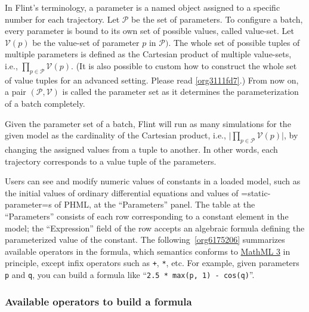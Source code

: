 \documentclass[a4paper,10pt]{report}
\begin{document}
In Flint's terminology, a parameter is a named object assigned to a specific
number for each trajectory.
Let \(\mathcal{P}\) be the set of parameters.
To configure a batch, every parameter is bound to its own set of possible
values, called value-set.
Let \(\mathcal{V}(p)\) be the value-set of parameter \(p\) in \(\mathcal{P})\).
The whole set of possible tuples of multiple parameters is defined as the
Cartesian product of multiple value-sets, i.e., \(\prod_{p \in \mathcal{P}}
\mathcal{V}(p)\).
(It is also possible to custom how to construct the whole set of value tuples
for an advanced setting. Please read \ref{org3111fd7}.)
From now on, a pair \((\mathcal{P}, \mathcal{V})\) is called the parameter set as
it determines the parameterization of a batch completely.

Given the parameter set of a batch, Flint will run as many simulations for the
given model as the cardinality of the Cartesian product, i.e.,
\(\lvert \prod_{p \in \mathcal{P}} \mathcal{V}(p) \rvert\), by changing the
assigned values from a tuple to another.
In other words, each trajectory corresponds to a value tuple of the parameters.

Users can see and modify numeric values of constants in a loaded model,
such as the initial values of ordinary differential equations and values of
=static-parameter=s of PHML, at the ``Parameters'' panel.
The table at the ``Parameters'' consists of each row corresponding to a constant
element in the model; the ``Expression'' field of the row accepts an algebraic
formula defining the parameterized value of the constant.
The following~\ref{org6175206} summarizes available operators in
the formula, which semantics conforms to \href{https://www.w3.org/TR/MathML3/}{MathML 3} in principle,
except infix operators such as \texttt{+}, \texttt{*}, etc.
For example, given parameters \texttt{p} and \texttt{q}, you can build a formula
like ``\texttt{2.5 * max(p, 1) - cos(q)}''.

\subsubsection{\label{org6175206}Available operators to build a formula}
\label{sec:orgec79e3b}
\end{document}
